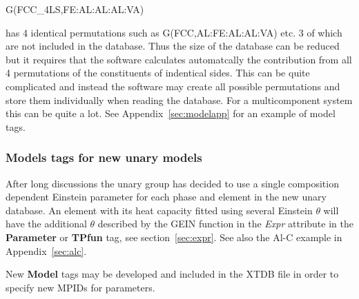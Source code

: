 \documentclass{article}
\begin{document}
G(FCC\_4LS,FE:AL:AL:AL:VA)

\noindent
has 4 identical permutations such as G(FCC,AL:FE:AL:AL:VA) etc. 3 of
which are not included in the database.  Thus the size of the database
can be reduced but it requires that the software calculates
automatcally the contribution from all 4 permutations of the
constituents of indentical sides.  This can be quite complicated and
instead the software may create all possible permutations and store
them individually when reading the database.  For a multicomponent
system this can be quite a lot.  See Appendix~\ref{sec:modelapp} for
an example of model tags.

\subsubsection{Models tags for new unary models}

After long discussions the unary group has decided to use a single
composition dependent Einstein parameter for each phase and element in
the new unary database.  An element with its heat capacity fitted
using several Einstein $\theta$ will have the additional $\theta$
described by the GEIN function in the {\em Expr} attribute in the {\bf
  Parameter} or {\bf TPfun} tag, see section~\ref{sec:expr}.  See also
the Al-C example in Appendix~\ref{sec:alc}.

New {\bf Model} tags may be developed and included in the XTDB file in
order to specify new MPIDs for parameters.
\end{document}
